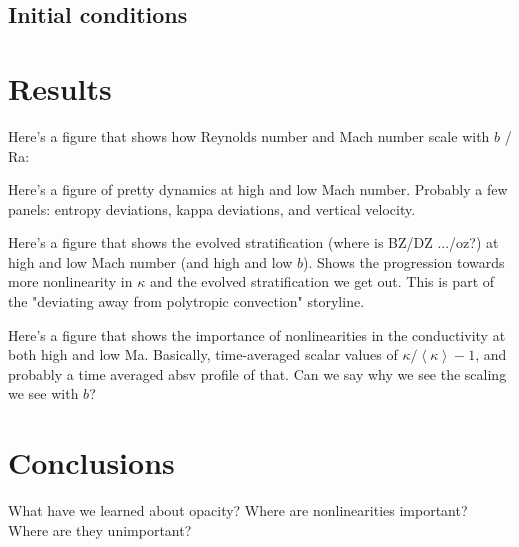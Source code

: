 \documentclass[twocolumn, amsmath, amsfonts, amssymb]{aastex62}
\newcommand{\angles}[1]{\ensuremath{\left\langle #1 \right\rangle}}
\begin{document}
\subsection{Initial conditions}




\section{Results} \label{sec:results}
Here's a figure that shows how Reynolds number and Mach number
scale with $b$ / Ra:

Here's a figure of pretty dynamics at high and low Mach number. Probably
a few panels: entropy deviations, kappa deviations, and vertical velocity.

Here's a figure that shows the evolved stratification (where is BZ/DZ .../oz?) 
at high and low Mach number (and high and low $b$). Shows the progression towards
more nonlinearity in $\kappa$ and the evolved stratification we get out. This
is part of the "deviating away from polytropic convection" storyline.

Here's a figure that shows the importance of nonlinearities in
the conductivity at both high and low Ma. Basically, time-averaged scalar
values of $\kappa/\angles{\kappa} - 1$, and probably a time averaged
absv profile of that. Can we say why we see the scaling we see with $b$?


\section{Conclusions} \label{sec:conclusions}
What have we learned about opacity? Where are nonlinearities important?
Where are they unimportant?



\end{document}

